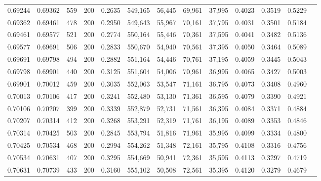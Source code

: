 \begin{tabular}{rrrrrrrrrrrrr}
0.69244 & 0.69362 &    559 & 200 &                                     0.2635 & 549,165 &  56,445 &  69,961 &  37,995 & 0.4023 & 0.3519 & 0.5229 \\
0.69362 & 0.69461 &    478 & 200 &                                     0.2950 & 549,643 &  55,967 &  70,161 &  37,795 & 0.4031 & 0.3501 & 0.5184 \\
0.69461 & 0.69577 &    521 & 200 &                                     0.2774 & 550,164 &  55,446 &  70,361 &  37,595 & 0.4041 & 0.3482 & 0.5136 \\
0.69577 & 0.69691 &    506 & 200 &                                     0.2833 & 550,670 &  54,940 &  70,561 &  37,395 & 0.4050 & 0.3464 & 0.5089 \\
0.69691 & 0.69798 &    494 & 200 &                                     0.2882 & 551,164 &  54,446 &  70,761 &  37,195 & 0.4059 & 0.3445 & 0.5043 \\
0.69798 & 0.69901 &    440 & 200 &                                     0.3125 & 551,604 &  54,006 &  70,961 &  36,995 & 0.4065 & 0.3427 & 0.5003 \\
0.69901 & 0.70012 &    459 & 200 &                                     0.3035 & 552,063 &  53,547 &  71,161 &  36,795 & 0.4073 & 0.3408 & 0.4960 \\
0.70013 & 0.70106 &    417 & 200 &                                     0.3241 & 552,480 &  53,130 &  71,361 &  36,595 & 0.4079 & 0.3390 & 0.4921 \\
0.70106 & 0.70207 &    399 & 200 &                                     0.3339 & 552,879 &  52,731 &  71,561 &  36,395 & 0.4084 & 0.3371 & 0.4884 \\
0.70207 & 0.70314 &    412 & 200 &                                     0.3268 & 553,291 &  52,319 &  71,761 &  36,195 & 0.4089 & 0.3353 & 0.4846 \\
0.70314 & 0.70425 &    503 & 200 &                                     0.2845 & 553,794 &  51,816 &  71,961 &  35,995 & 0.4099 & 0.3334 & 0.4800 \\
0.70425 & 0.70534 &    468 & 200 &                                     0.2994 & 554,262 &  51,348 &  72,161 &  35,795 & 0.4108 & 0.3316 & 0.4756 \\
0.70534 & 0.70631 &    407 & 200 &                                     0.3295 & 554,669 &  50,941 &  72,361 &  35,595 & 0.4113 & 0.3297 & 0.4719 \\
0.70631 & 0.70739 &    433 & 200 &                                     0.3160 & 555,102 &  50,508 &  72,561 &  35,395 & 0.4120 & 0.3279 & 0.4679 \\

\end{tabular}
